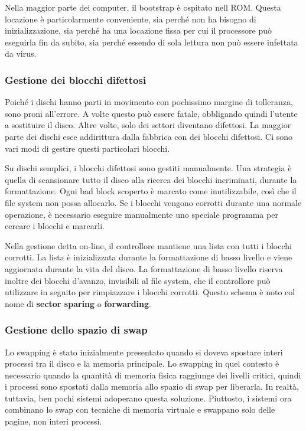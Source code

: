 \documentclass[a4]{article}
\begin{document}
Nella maggior parte dei computer, il bootstrap è ospitato nell ROM. Questa locazione è particolarmente conveniente, sia perché non ha bisogno di inizializzazione, sia perché ha una locazione fissa per cui il processore può eseguirla fin da subito, sia perché essendo di sola lettura non può essere infettata da virus.

\subsubsection{Gestione dei blocchi difettosi}
Poiché i dischi hanno parti in movimento con pochissimo margine di tolleranza, sono proni all'errore. A volte questo può essere fatale, obbligando quindi l'utente a sostituire il disco. Altre volte, solo dei settori diventano difettosi. La maggior parte dei dischi esce addirittura dalla fabbrica con dei blocchi difettosi. Ci sono vari modi di gestire questi particolari blocchi.

Su dischi semplici, i blocchi difettosi sono gestiti manualmente. Una strategia è quella di scansionare tutto il disco alla ricerca dei blocchi incriminati, durante la formattazione. Ogni bad block scoperto è marcato come inutilizzabile, così che il file system non possa allocarlo. Se i blocchi vengono corrotti durante una normale operazione, è necessario eseguire manualmente uno speciale programma per cercare i blocchi e marcarli.

Nella gestione detta on-line, il controllore mantiene una lista con tutti i blocchi corrotti. La lista è inizializzata durante la formattazione di basso livello e viene aggiornata durante la vita del disco. La formattazione di basso livello riserva inoltre dei blocchi d'avanzo, invisibili al file system, che il controllore può utilizzare in seguito per rimpiazzare i blocchi corrotti. Questo schema è noto col nome di \textbf{sector sparing} o \textbf{forwarding}.

\subsubsection{Gestione dello spazio di swap}
Lo swapping è stato inizialmente presentato quando si doveva spostare interi processi tra il disco e la memoria principale. Lo swapping in quel contesto è necessario quando la quantità di memoria fisica raggiunge dei livelli critici, quindi i processi sono spostati dalla memoria allo spazio di swap per liberarla. In realtà, tuttavia, ben pochi sistemi adoperano questa soluzione. Piuttosto, i sistemi ora combinano lo swap con tecniche di memoria virtuale e swappano solo delle pagine, non interi processi.
\end{document}
